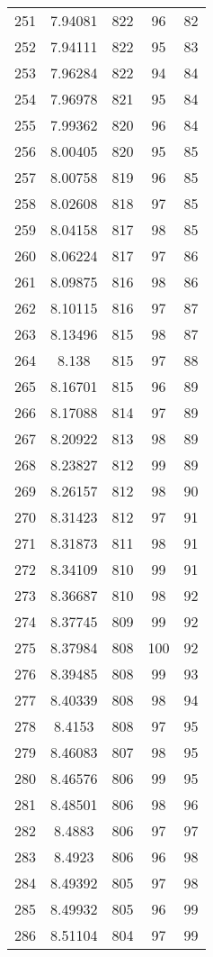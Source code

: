 \documentclass[12pt,a4paper]{article}
\begin{document}
\begin{tabular}{r|cccc}
	251 & 7.94081 & 822 & 96 & 82 \\
	252 & 7.94111 & 822 & 95 & 83 \\
	253 & 7.96284 & 822 & 94 & 84 \\
	254 & 7.96978 & 821 & 95 & 84 \\
	255 & 7.99362 & 820 & 96 & 84 \\
	256 & 8.00405 & 820 & 95 & 85 \\
	257 & 8.00758 & 819 & 96 & 85 \\
	258 & 8.02608 & 818 & 97 & 85 \\
	259 & 8.04158 & 817 & 98 & 85 \\
	260 & 8.06224 & 817 & 97 & 86 \\
	261 & 8.09875 & 816 & 98 & 86 \\
	262 & 8.10115 & 816 & 97 & 87 \\
	263 & 8.13496 & 815 & 98 & 87 \\
	264 & 8.138 & 815 & 97 & 88 \\
	265 & 8.16701 & 815 & 96 & 89 \\
	266 & 8.17088 & 814 & 97 & 89 \\
	267 & 8.20922 & 813 & 98 & 89 \\
	268 & 8.23827 & 812 & 99 & 89 \\
	269 & 8.26157 & 812 & 98 & 90 \\
	270 & 8.31423 & 812 & 97 & 91 \\
	271 & 8.31873 & 811 & 98 & 91 \\
	272 & 8.34109 & 810 & 99 & 91 \\
	273 & 8.36687 & 810 & 98 & 92 \\
	274 & 8.37745 & 809 & 99 & 92 \\
	275 & 8.37984 & 808 & 100 & 92 \\
	276 & 8.39485 & 808 & 99 & 93 \\
	277 & 8.40339 & 808 & 98 & 94 \\
	278 & 8.4153 & 808 & 97 & 95 \\
	279 & 8.46083 & 807 & 98 & 95 \\
	280 & 8.46576 & 806 & 99 & 95 \\
	281 & 8.48501 & 806 & 98 & 96 \\
	282 & 8.4883 & 806 & 97 & 97 \\
	283 & 8.4923 & 806 & 96 & 98 \\
	284 & 8.49392 & 805 & 97 & 98 \\
	285 & 8.49932 & 805 & 96 & 99 \\
	286 & 8.51104 & 804 & 97 & 99 \\

\end{tabular}
\end{document}
